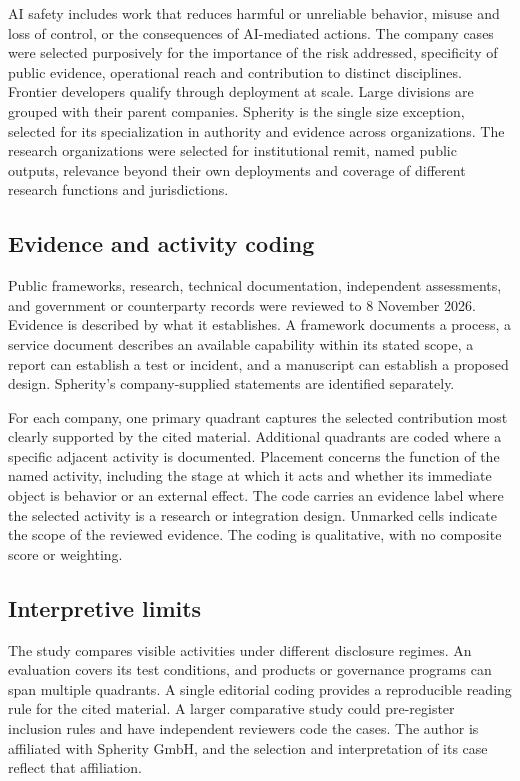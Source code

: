 AI safety includes work that reduces harmful or unreliable behavior, misuse and loss of control, or the consequences of AI-mediated actions. The company cases were selected purposively for the importance of the risk addressed, specificity of public evidence, operational reach and contribution to distinct disciplines. Frontier developers qualify through deployment at scale. Large divisions are grouped with their parent companies. Spherity is the single size exception, selected for its specialization in authority and evidence across organizations. The research organizations were selected for institutional remit, named public outputs, relevance beyond their own deployments and coverage of different research functions and jurisdictions.~\cite{src1,src3,src4}

\subsection{Evidence and activity coding}

Public frameworks, research, technical documentation, independent assessments, and government or counterparty records were reviewed to 8 November 2026. Evidence is described by what it establishes. A framework documents a process, a service document describes an available capability within its stated scope, a report can establish a test or incident, and a manuscript can establish a proposed design. Spherity's company-supplied statements are identified separately.

For each company, one primary quadrant captures the selected contribution most clearly supported by the cited material. Additional quadrants are coded where a specific adjacent activity is documented. Placement concerns the function of the named activity, including the stage at which it acts and whether its immediate object is behavior or an external effect. The code carries an evidence label where the selected activity is a research or integration design. Unmarked cells indicate the scope of the reviewed evidence. The coding is qualitative, with no composite score or weighting.

\subsection{Interpretive limits}

The study compares visible activities under different disclosure regimes. An evaluation covers its test conditions, and products or governance programs can span multiple quadrants. A single editorial coding provides a reproducible reading rule for the cited material. A larger comparative study could pre-register inclusion rules and have independent reviewers code the cases. The author is affiliated with Spherity GmbH, and the selection and interpretation of its case reflect that affiliation.

